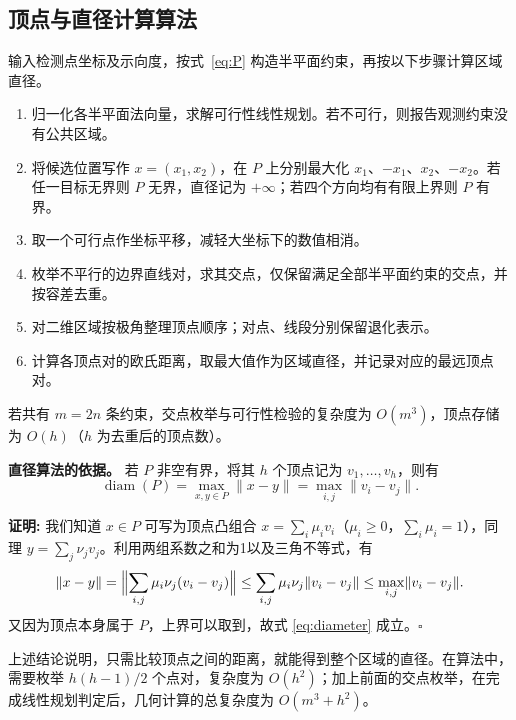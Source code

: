 \documentclass[UTF8,a4paper,zihao=-4,fontset=none]{ctexart}
\begin{document}
\subsection{顶点与直径计算算法}

输入检测点坐标及示向度，按式~\eqref{eq:P} 构造半平面约束，再按以下步骤计算区域直径。

\begin{enumerate}[label=(\arabic*),leftmargin=2.2em]
  \item 归一化各半平面法向量，求解可行性线性规划。若不可行，则报告观测约束没有公共区域。
  \item 将候选位置写作 \(x=(x_1,x_2)\)，在 \(P\) 上分别最大化 \(x_1\)、\(-x_1\)、\(x_2\)、\(-x_2\)。若任一目标无界则 \(P\) 无界，直径记为 \(+\infty\)；若四个方向均有有限上界则 \(P\) 有界。
  \item 取一个可行点作坐标平移，减轻大坐标下的数值相消。
  \item 枚举不平行的边界直线对，求其交点，仅保留满足全部半平面约束的交点，并按容差去重。
  \item 对二维区域按极角整理顶点顺序；对点、线段分别保留退化表示。
  \item 计算各顶点对的欧氏距离，取最大值作为区域直径，并记录对应的最远顶点对。
\end{enumerate}

若共有 \(m=2n\) 条约束，交点枚举与可行性检验的复杂度为 \(O(m^3)\)，顶点存储为 \(O(h)\)（\(h\) 为去重后的顶点数）。

\textbf{直径算法的依据。} 若 \(P\) 非空有界，将其 \(h\) 个顶点记为 \(v_1,\dots,v_h\)，则有
\begin{equation}
  \operatorname{diam}(P)=\max_{x,y\in P}\lVert x-y\rVert=\max_{i,j}\lVert v_i-v_j\rVert .
  \label{eq:diameter}
\end{equation}

\textbf{证明:} 我们知道 \(x\in P\) 可写为顶点凸组合 \(x=\sum_i\mu_iv_i\)（\(\mu_i\ge0\)，\(\sum_i\mu_i=1\)），同理 \(y=\sum_j\nu_jv_j\)。利用两组系数之和为1以及三角不等式，有
\begin{equation}
  \lVert x-y\rVert
  =\Bigl\lVert\sum_{i,j}\mu_i\nu_j(v_i-v_j)\Bigr\rVert
  \le\sum_{i,j}\mu_i\nu_j\lVert v_i-v_j\rVert
  \le\max_{i,j}\lVert v_i-v_j\rVert .
\end{equation}
又因为顶点本身属于 \(P\)，上界可以取到，故式 \eqref{eq:diameter} 成立。\(\square\) 
\vspace{0.5em}

上述结论说明，只需比较顶点之间的距离，就能得到整个区域的直径。在算法中，需要枚举 \(h(h-1)/2\) 个点对，复杂度为 \(O(h^2)\)；加上前面的交点枚举，在完成线性规划判定后，几何计算的总复杂度为 \(O(m^3+h^2)\)。
\end{document}
